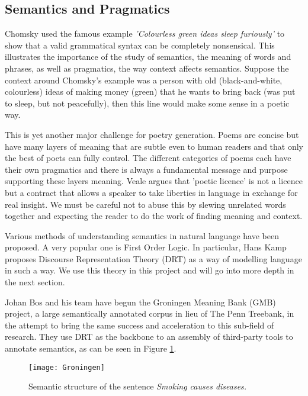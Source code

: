 \subsection{Semantics and Pragmatics}
\label{sec:semantics}
Chomsky used the famous example \textit{'Colourless green ideas sleep furiously'} to show that a valid grammatical syntax can be completely nonsensical\cite{chomsky2002syntactic}. This illustrates the importance of the study of semantics, the meaning of words and phrases, as well as pragmatics, the way context affects semantics. Suppose the context around Chomsky's example was a person with old (black-and-white, colourless) ideas of making money (green) that he wants to bring back (was put to sleep, but not peacefully), then this line would make some sense in a poetic way.

This is yet another major challenge for poetry generation. Poems are concise but have many layers of meaning that are subtle even to human readers and that only the best of poets can fully control. The different categories of poems each have their own pragmatics and there is always a fundamental message and purpose supporting these layers meaning. Veale argues that 'poetic licence' is not a licence but a contract that allows a speaker to take liberties in language in exchange for real insight\cite{veale2013less}. We must be careful not to abuse this by slewing unrelated words together and expecting the reader to do the work of finding meaning and context.

Various methods of understanding semantics in natural language have been proposed. A very popular one is First Order Logic. In particular, Hans Kamp proposes Discourse Representation Theory (DRT) as a way of modelling language in such a way. We use this theory in this project and will go into more depth in the next section.

Johan Bos and his team have begun the Groningen Meaning Bank (GMB) project\cite{BasileBosEvangVenhuizen2012LREC}, a large semantically annotated corpus in lieu of The Penn Treebank, in the attempt to bring the same success and acceleration to this sub-field of research. They use DRT as the backbone to an assembly of third-party tools to annotate semantics, as can be seen in Figure \ref{fig:gmb}.

\begin{figure}[h!]
\centering
\texttt{[image: Groningen]}
\caption{Semantic structure of the sentence \textit{Smoking causes diseases.}}
\label{fig:gmb}
\end{figure}

